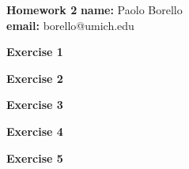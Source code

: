 \documentclass[10pt,notitlepage]{article}
\newcommand{\MBlue}[1]{{\color{MBlue}#1}}
\begin{document}
	\begin{center}
		\huge{\MBlue{\textbf{Homework 2}}}		
		\vskip20pt
		\large{
			\textbf{name:} Paolo Borello\\
            \textbf{email:} borello@umich.edu}
	\end{center}

    \vskip20pt
    \noindent
    \textbf{\large \MBlue{Exercise 1}}
    \vskip10pt
    \noindent
	\begin{exercise}[Solution]
    \end{exercise}

    \newpage
    \textbf{\large \MBlue{Exercise 2}}
    \vskip10pt
    \noindent
	\begin{exercise}[Solution]
    \end{exercise}

    \newpage
    \textbf{\large \MBlue{Exercise 3}}
    \vskip10pt
    \noindent
	\begin{exercise}[Solution]
    \end{exercise}

    \newpage
    \textbf{\large \MBlue{Exercise 4}}
    \vskip10pt
    \noindent
	\begin{exercise}[Solution]
    \end{exercise}

    \newpage
    \textbf{\large \MBlue{Exercise 5}}
    \vskip10pt
    \noindent
	\begin{exercise}[Solution]
    \end{exercise}
\end{document}
